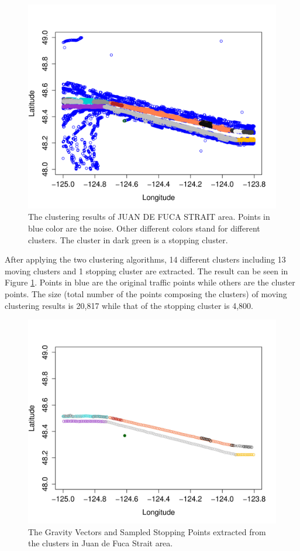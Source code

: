 \documentclass[12pt,glossary]{dalcsthesis}
\begin{document}
\begin{figure}[!htb]
\centering
\includegraphics[width=5in]{clusterResultJDFK.png}
\caption{The clustering results of JUAN DE FUCA STRAIT area. Points in blue color are the noise. Other different colors stand for different clusters. The cluster in dark green is a stopping cluster. }
\label{fig:jdfk_cluster}
\end{figure}

After applying the two clustering algorithms, 14 different clusters including 13 moving clusters and 1 stopping cluster are extracted. The result can be seen in Figure \ref{fig:jdfk_cluster}. Points in blue are the original traffic points while others are the cluster points. The size (total number of the points composing the clusters) of moving clustering results is 20,817 while that of the stopping cluster is 4,800.


\begin{figure}[!htb]
\centering
\includegraphics[width=5in]{clusterGV.jpg}
\caption{The Gravity Vectors and Sampled Stopping Points extracted from the clusters in Juan de Fuca Strait area.}
\label{fig:jdfk_gv}
\end{figure}
\end{document}
